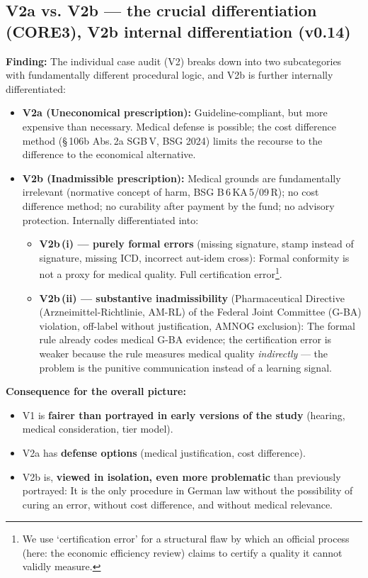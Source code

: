 \documentclass{umbruch-position}
\providecommand{\textgerman}[1]{#1}
\begin{document}
\subsection{V2a vs. V2b --- the crucial differentiation (CORE3), V2b internal differentiation (v0.14)}

\textbf{Finding:} The individual case audit (V2) breaks down into two subcategories with fundamentally different procedural logic, and V2b is further internally differentiated:

\begin{itemize}
  \item \textbf{V2a (Uneconomical prescription):} Guideline-compliant, but more expensive than necessary. Medical defense is possible; the cost difference method (\S\,106b Abs.\,2a SGB\,V, BSG 2024) limits the recourse to the difference to the economical alternative.
  \item \textbf{V2b (Inadmissible prescription):} Medical grounds are fundamentally irrelevant (normative concept of harm, BSG B\,6\,KA\,5/09\,R); no cost difference method; no curability after payment by the fund; no advisory protection. Internally differentiated into:
  \begin{itemize}
    \item \textbf{V2b\,(i) --- purely formal errors} (missing signature, stamp instead of signature, missing ICD, incorrect aut-idem cross): Formal conformity is not a proxy for medical quality. Full certification error\footnote{We use `certification error' for a structural flaw by which an official process (here: the economic efficiency review) claims to certify a quality it cannot validly measure.}.
    \item \textbf{V2b\,(ii) --- substantive inadmissibility} (Pharmaceutical Directive (\textgerman{Arzneimittel-Richtlinie}, AM-RL) of the Federal Joint Committee (G-BA) violation, off-label without justification, AMNOG exclusion): The formal rule already codes medical G-BA evidence; the certification error is weaker because the rule measures medical quality \emph{indirectly} --- the problem is the punitive communication instead of a learning signal.
  \end{itemize}
\end{itemize}

\textbf{Consequence for the overall picture:}
\begin{itemize}
  \item V1 is \textbf{fairer than portrayed in early versions of the study} (hearing, medical consideration, tier model).
  \item V2a has \textbf{defense options} (medical justification, cost difference).
  \item V2b is, \textbf{viewed in isolation, even more problematic} than previously portrayed: It is the only procedure in German law without the possibility of curing an error, without cost difference, and without medical relevance.
\end{itemize}
\end{document}
